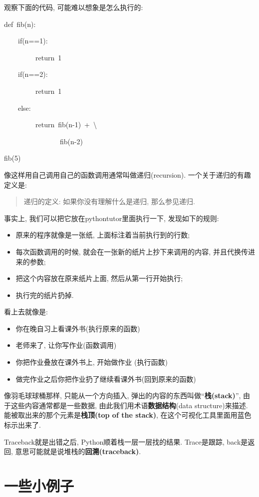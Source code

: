 观察下面的代码, 可能难以想象是怎么执行的:
\begin{lyxcode}
def~fib(n):

~~~~if(n==1):

~~~~~~~~~return~1

~~~~if(n==2):

~~~~~~~~~return~1

~~~~else:

~~~~~~~~~return~fib(n-1)~+~\textbackslash{}

~~~~~~~~~~~~~~~~fib(n-2)

fib(5)
\end{lyxcode}
像这样用自己调用自己的函数调用通常叫做递归(recursion). 一个关于递归的有趣定义是:
\begin{quote}
递归的定义: 如果你没有理解什么是递归, 那么参见递归. 
\end{quote}
事实上, 我们可以把它放在pythontutor里面执行一下, 发现如下的规则:
\begin{itemize}
\item 原来的程序就像是一张纸, 上面标注着当前执行到的行数;
\item 每次函数调用的时候, 就会在一张新的纸片上抄下来调用的内容, 并且代换传进来的参数;
\item 把这个内容放在原来纸片上面, 然后从第一行开始执行;
\item 执行完的纸片扔掉.
\end{itemize}
看上去就像是:
\begin{itemize}
\item 你在晚自习上看课外书(执行原来的函数) 
\item 老师来了, 让你写作业(函数调用) 
\item 你把作业叠放在课外书上, 开始做作业 (执行函数)
\item 做完作业之后你把作业扔了继续看课外书(回到原来的函数)
\end{itemize}
像羽毛球球桶那样, 只能从一个方向插入, 弹出的内容的东西叫做``\textbf{栈(stack)}'', 由于这些内容通常都是一些数据,
由此我们用术语\textbf{数据结构}(data structure)来描述. 能被取出来的那个元素是\textbf{栈顶(top
of the stack)}, 在这个可视化工具里面用蓝色标示出来了. 

Traceback就是出错之后, Python顺着栈一层一层找的结果. Trace是跟踪, back是返回, 意思可能就是说堆栈的\textbf{回溯(traceback)}.





\section{一些小例子}


